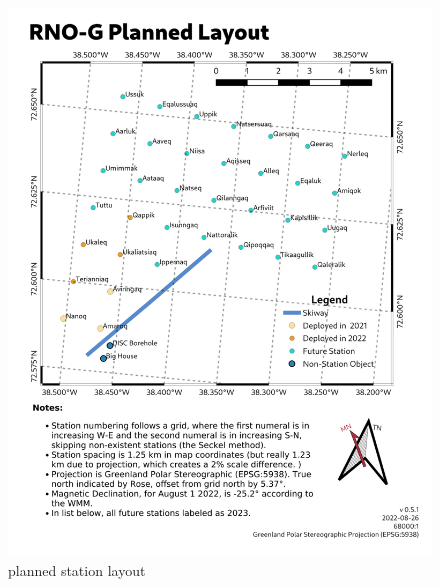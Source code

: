 \begin{figure}
	\includegraphics[width=\textwidth]{figures/station-map.png}	
	\caption{planned station layout}
	\label{fig:station map}
\end{figure}


